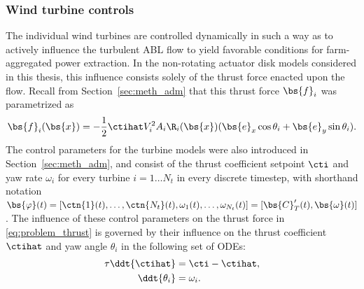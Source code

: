 \subsubsection{Wind turbine controls}\label{sec:opt_problem_controls}
The individual wind turbines are controlled dynamically in such a way as to actively influence the turbulent ABL flow to yield favorable conditions for farm-aggregated power extraction. In the non-rotating actuator disk models considered in this thesis, this influence consists solely of the thrust force enacted upon the flow. Recall from Section~\ref{sec:meth_adm} that this thrust force $\bs{f}_i$ was parametrized as
\begin{equation}\label{eq:problem_thrust}
\bs{f}_i(\bs{x}) = -\frac{1}{2} \ctihat V_i^2 A_i \R_i(\bs{x}) (\bs{e}_x \cos \theta_i + \bs{e}_y \sin \theta_i).
\end{equation} 
The control parameters for the turbine models were also introduced in Section~\ref{sec:meth_adm}, and consist of the thrust coefficient setpoint $\cti$ and yaw rate $\omega_i$ for every turbine $i = 1 \dots N_t$ in every discrete timestep, with shorthand notation $\bs{\varphi}(t) = [\ctn{1}(t), \dots, \ctn{N_t}(t), \omega_1(t), \dots, \omega_{N_t}(t)] = [\bs{C}_T'(t), \bs{\omega}(t)]$. The influence of these control parameters on the thrust force in \eqref{eq:problem_thrust} is governed by their influence on the thrust coefficient $\ctihat$ and yaw angle $\theta_i$ in the following set of ODEs:
\begin{align}
\tau \ddt{\ctihat} &= \cti - \ctihat \label{eq:problem_timefilter_def},\\
\ddt{\theta_i} &= \omega_i \label{eq:problem_omega_def}.
\end{align}

